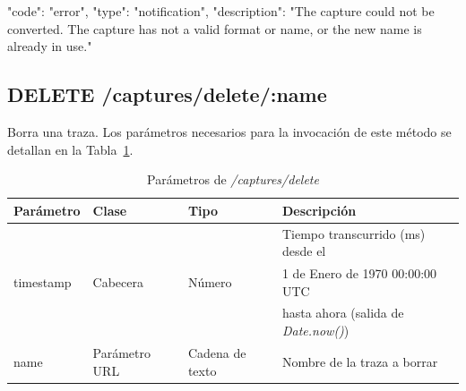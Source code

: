 \begin{itemize}
{\begin{minipage}{\textwidth}
\begin{code}[language=json]
{
  "code": "error",
  "type": "notification",
  "description": "The capture could not be converted. The capture has not a valid format or name, or the new name is already in use."
}
\end{code}
\end{minipage}
}
\end{itemize}

%
%
\subsection{DELETE /captures/delete/:name}
Borra una \gls{traza}.
Los parámetros necesarios para la invocación de este método se detallan en la Tabla~\ref{extra:api:capturesdelete:invocacion}.

\begin{table}[H]
\centering
\begin{tabular}{|l|l|l|l|}
\hline
\rowcolor[HTML]{F5F5F5}
\textbf{Parámetro}  & \textbf{Clase} & \textbf{Tipo}   & \textbf{Descripción}                        \\ \hline
                    &                &                 & Tiempo transcurrido (ms) desde el           \\
timestamp           & Cabecera       & Número          & 1 de Enero de 1970 00:00:00 UTC             \\
                    &                &                 & hasta ahora (salida de \textit{Date.now()}) \\ \hline
name                & Parámetro URL  & Cadena de texto & Nombre de la \gls{traza} a borrar           \\ \hline
\end{tabular}
\caption{Parámetros de \textit{/captures/delete}}
\label{extra:api:capturesdelete:invocacion}
\end{table}

